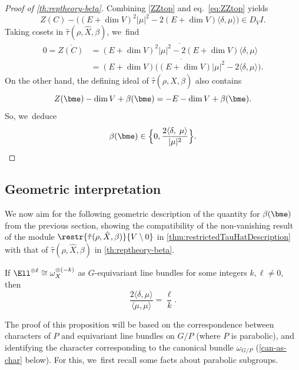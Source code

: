 \begin{proof}[Proof of \cref{th:reptheory-beta}]
Combining \cref{ZZtop} and eq.~\eqref{eq:ZZtop} yields\vspace*{-3pt}
\begin{equation*}
Z(C) - \bigl((E+\dim{V})^2|\mu|^2 - 2(E+\dim{V})\langle\delta,\mu\rangle\bigr)\in D_V I.
\end{equation*}
Taking cosets in $\hat\tau(\rho, \hat{X},\beta)$, we~find\vspace*{-3pt}
\begin{align*}
0 = \overline{Z(C)}
&= \overline{(E+\dim{V})^2|\mu|^2 - 2(E+\dim{V})\langle\delta,\mu\rangle}\\
&= \overline{(E+\dim{V})\bigl((E+\dim{V})|\mu|^2 - 2\langle\delta,\mu\rangle\bigr)}.
\end{align*}
On the other hand, the defining ideal of $\hat\tau(\rho, \hat{X},\beta)$ also contains\vspace*{-3pt}
\[
Z(\bme) -\dim{V} + \beta(\bme) = -E - \dim{V} + \beta(\bme).
\]
So, we~deduce\vspace*{-3pt}
\[
\beta(\bme) \in \Bigl\{0, \frac{2\langle\delta,\;\mu\rangle}{|\mu|^2}\Bigr\}.\qedhere
\]
\end{proof}

\subsection{Geometric interpretation}

We now aim for the following geometric description of the quantity for $\beta(\bme)$ from the previous section, showing the compatibility of the non-vanishing result of the module $\restr{\hat{\tau}(\rho,\hat X, \beta)}{V \setminus 0}$ in \cref{thm:restrictedTauHatDescription} with that of
$\hat{\tau}(\rho,\hat{X},\beta)$ in \cref{th:reptheory-beta}.

\begin{prop} \label{prop:repTheoreticDescription}
If $\Ell^{\otimes \ell} \cong \omega_X^{\otimes (-k)}$ as $G$-equivariant line bundles for some integers $k, \ell \neq 0$, then\vspace*{-3pt}
\[
\frac{2\langle \delta, \mu \rangle}{\langle \mu, \mu \rangle} = \frac{\ell}{k}.
\]
\end{prop}

The proof of this proposition will be based on the correspondence between characters of $P$ and equivariant line bundles on $G/P$ (where $P$ is parabolic), and identifying the character corresponding to the canonical bundle $\omega_{G/P}$ (\cref{can-as-char} below). For this, we~first recall some facts about parabolic subgroups.


